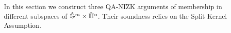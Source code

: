 In this section we construct three QA-NIZK arguments of membership in different subspaces of ${\hat{\mathbb{G}}}^{m} \times {\ensuremath{\check{\mathbb{H}}}}^{n}$. Their soundness relies on the Split Kernel Assumption. 

